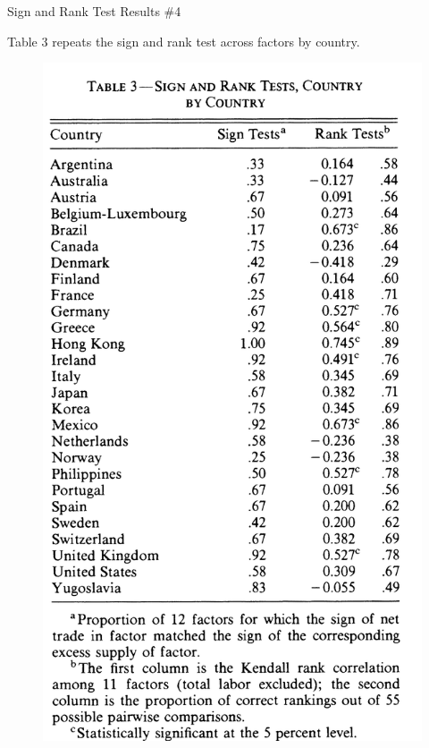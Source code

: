 \documentclass[aspectratio=169]{beamer}
\begin{document}
\begin{frame}{Sign and Rank Test Results \#4}

Table 3 repeats the sign and rank test across factors by country.
 
\begin{figure}
    \centering
    \includegraphics[scale = 0.5]{Table 3.png}
    \label{fig:Table3}
\end{figure} 
    
\end{frame}
\end{document}
